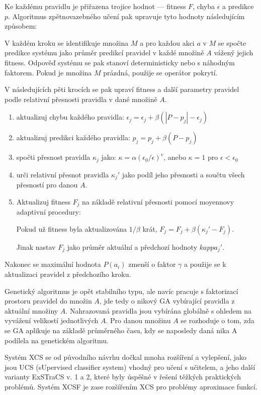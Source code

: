 Ke každému pravidlu je přiřazena trojice hodnot --- fitness $F$, chyba $\epsilon$ a predikce $p$. Algoritmus zpětnovazebného učení pak upravuje tyto hodnoty následujícím způsobem:  

V každém kroku se identifikuje množina $M$ a pro každou akci $a$ v $M$ se spočte predikce systému jako průměr predikcí pravidel v každé množině $A$ vážený jejich fitness. Odpověď systému se pak stanoví deterministicky nebo s náhodným faktorem. Pokud je množina $M$ prázdná, použije se operátor pokrytí.  

V následujících pěti krocích se pak upraví fitness a další parametry pravidel podle relativní přesnosti pravidla v dané množině $A$.

\begin{enumerate}
\item aktualizuj chybu každého pravidla: $\epsilon_j = \epsilon_j + \beta \left( \left| P - p_j \right| - \epsilon_j \right)$

\item aktualizuj predikci každého pravidla: $p_j = p_j + \beta (P-p_j)$

\item spočti přesnost pravidla $\kappa_j$ jako: $\kappa = \alpha (\epsilon_0/\epsilon)^v$, anebo $\kappa=1$ pro $\epsilon < \epsilon_0$

\item urči relativní přesnot pravidla $\kappa_j\prime$ jako podíl jeho přesnosti a součtu všech přesností pro danou $A$.

\item Aktualizuj fitness $F_j$ na základě relativní přesnosti pomocí moyennovy adaptivní procedury: 

Pokud už fitness byla aktualizována $1/\beta$ krát,
 $F_j = F_j + \beta(\kappa_j\prime - F_j).$ 
 
Jinak nastav $F_j$ jako průměr aktuální a předchozí hodnoty
$kappa_j\prime$.
\end{enumerate}

Nakonec se maximální hodnota $P(a_i)$ zmenší o faktor $\gamma$ a použije se k aktualizaci pravidel z předchozího kroku.

Genetický algoritmus je opět stabilního typu, ale navíc pracuje s faktorizací prostoru pravidel do množin $A$, jde tedy o nikový GA vybírající pravidla z aktuální množiny $A$. Nahrazovaná pravidla jsou vybírána globálně s ohledem na vyvážení velikostí jednotlivých $A$. Pro danou množinu $A$ se rozhoduje o tom, zda se GA aplikuje na základě průměrného času, kdy se naposledy daná nika A podílela na genetickém algoritmu. 

Systém XCS se od původního návrhu dočkal mnoha rozšíření a vylepšení, jako jsou UCS (sUpervised classifier system) vhodný pro učení s učitelem, a jeho další varianty ExSTraCS v. 1 a 2, které byly úspěšné v řešení těžkých praktických problémů. Systém XCSF je zase rozšířením XCS pro problémy aproximace funkcí. 

